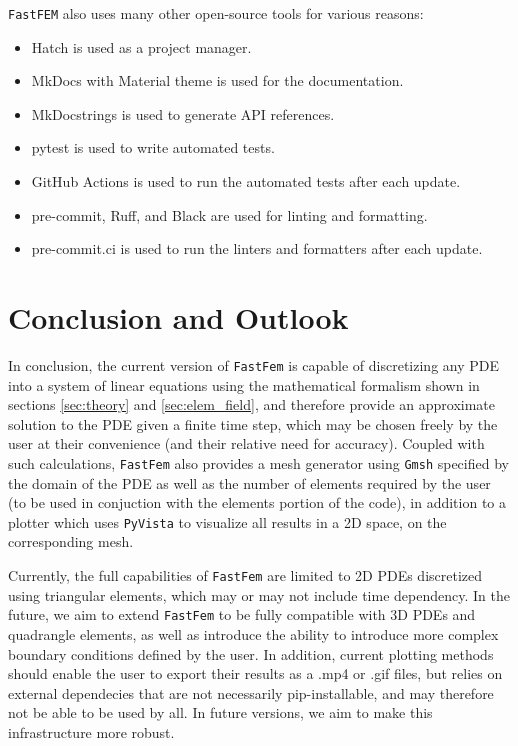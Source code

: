 \documentclass[headings=standardclasses, abstract=true]{scrartcl}
\begin{document}
\texttt{FastFEM} also uses many other open-source tools for various reasons:
\begin{itemize}
    \item Hatch\supercite{hatch} is used as a project manager.
    \item MkDocs\supercite{mkdocs} with Material theme\supercite{mkdocsmaterial} is used for the documentation.
    \item MkDocstrings\supercite{mkdocstrings} is used to generate API references.
    \item pytest\supercite{pytest} is used to write automated tests.
    \item GitHub Actions\supercite{githubactions} is used to run the automated tests after each update.
    \item pre-commit\supercite{precommit}, Ruff\supercite{ruff}, and Black\supercite{black} are used for linting and formatting.
    \item pre-commit.ci is used to run the linters and formatters after each update.
\end{itemize}

\section{Conclusion and Outlook}

In conclusion, the current version of \texttt{FastFem} is capable of discretizing any PDE into a system of linear equations using the mathematical formalism shown in sections \ref{sec:theory} and \ref{sec:elem_field}, and therefore provide an approximate solution to the PDE given a finite time step, which may be chosen freely by the user at their convenience (and their relative need for accuracy). Coupled with such calculations, \texttt{FastFem} also provides a mesh generator using \texttt{Gmsh} specified by the domain of the PDE as well as the number of elements required by the user (to be used in conjuction with the elements portion of the code), in addition to a plotter which uses \texttt{PyVista} to visualize all results in a 2D space, on the corresponding mesh.

Currently, the full capabilities of \texttt{FastFem} are limited to 2D PDEs discretized using triangular elements, which may or may not include time dependency. In the future, we aim to extend \texttt{FastFem} to be fully compatible with 3D PDEs and quadrangle elements, as well as introduce the ability to introduce more complex boundary conditions defined by the user. In addition, current plotting methods should enable the user to export their results as a .mp4 or .gif files, but relies on external dependecies that are not necessarily pip-installable, and may therefore not be able to be used by all. In future versions, we aim to make this infrastructure more robust.

\clearpage
\printbibliography
\end{document}
